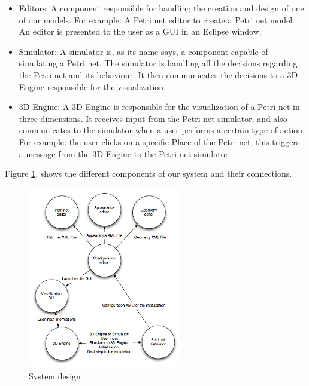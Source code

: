 \begin{itemize}
  \item Editors: A component responsible for handling the creation and design of one of our models. \newline
	For example: A Petri net editor to create a Petri net model. \newline
	An editor is presented to the user as a GUI in an Eclipse window.
  \item Simulator: A simulator is, as its name says, a component capable of simulating a Petri net.
	The simulator is handling all the decisions regarding the Petri net and its behaviour. 
	It then communicates the decisions to a 3D Engine responsible for the visualization.
  \item 3D Engine: A 3D Engine is responsible for the visualization of a Petri net in three dimensions.
	It receives input from the Petri net simulator, and also communicates to the simulator when a user performs a certain type of action. \newline
	For example: the user clicks on a specific Place of the Petri net, this triggers a message from the 3D Engine to the Petri net simulator 
\end{itemize}
\newpage
Figure \ref{fig:system_diagram}. shows the different components of our system and their connections.

\begin{figure}[htp]
\begin{center}
  \includegraphics[width=0.6\textwidth]{image/system_design.png}
  \caption{System design}
  \label{fig:system_diagram}
\end{center}
\end{figure}

